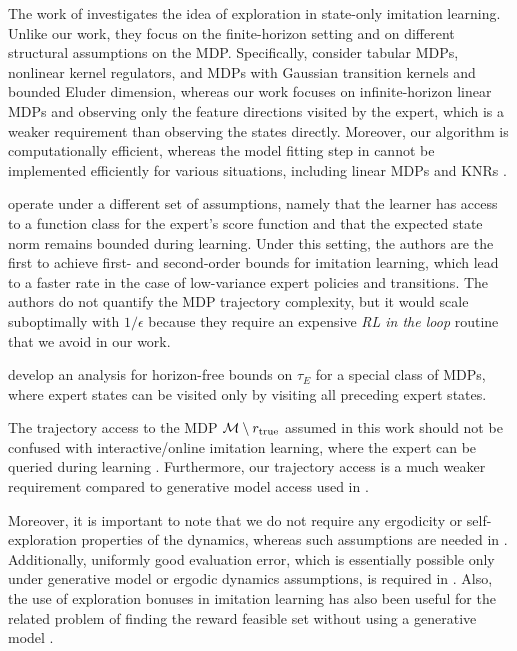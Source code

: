 The work of \citet{kidambi2021mobile} investigates the idea of exploration in state-only imitation learning. 
Unlike our work, they focus on the finite-horizon setting and on different structural assumptions on the MDP. 
Specifically, \citet{kidambi2021mobile} consider tabular MDPs, nonlinear kernel regulators, and MDPs with Gaussian transition kernels and bounded Eluder dimension, whereas our work focuses on infinite-horizon linear MDPs and observing only the feature directions visited by the expert, which is a weaker requirement than observing the states directly.
Moreover, our algorithm \FRAalg is computationally efficient, whereas the model fitting step in \cite{kidambi2021mobile} cannot be implemented efficiently for various situations, including linear MDPs \citep{jin2019provably} and KNRs \citep{Kakade:2020}.

\citet{wu2024diffusing} operate under a different set of assumptions, namely that the learner has access to a function class for the expert's score function and that the expected state norm remains bounded during learning. 
Under this setting, the authors are the first to achieve first- and second-order bounds for imitation learning, which lead to a faster rate in the case of low-variance expert policies and transitions. The authors do not quantify the MDP trajectory complexity, but it would scale suboptimally with $1/\epsilon$ because they require an expensive \emph{RL in the loop} routine that we avoid in our work.

\citet{xu2022understanding} develop an analysis for horizon-free bounds on $\tau_E$ for a special class of MDPs, where expert states can be visited only by visiting all preceding expert states.

The trajectory access to the MDP $\mathcal{M}\setminus r_{\textup{true}}$ assumed in this work should not be confused with interactive/online imitation learning, where the expert can be queried during learning \citep{Ross:2010,Ross:2011,swamy2021moments,li2022efficient,lavington2022improved,sekhari2024selective,sun2017deeply,sekhari2024contextual}. Furthermore, our trajectory access is a much weaker requirement compared to generative model access used in \citep{swamy2022minimax,Kamoutsi:2021}.

Moreover, it is important to note that we do not require any ergodicity or self-exploration properties of the dynamics, whereas such assumptions are needed in \citep{viano2022proximal,zeng2022maximum}. Additionally, uniformly good evaluation error, which is essentially possible only under generative model or ergodic dynamics assumptions, is required in \citep{wu2023inverse,zeng2022structural,zeng2023understanding}. 
Also, the use of exploration bonuses in imitation learning has also been useful for the related problem of finding the reward feasible set without using a generative model \citep{lazzati2024scale,lindner2022active}.

